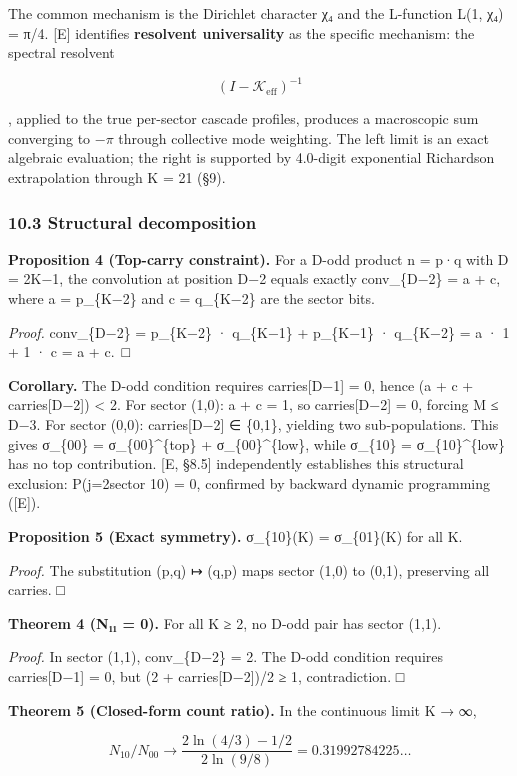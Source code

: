 \documentclass[
  11pt,
]{article}
\begin{document}
The common mechanism is the Dirichlet character χ₄ and the L-function L(1, χ₄) =
π/4. {[}E{]} identifies \textbf{resolvent universality} as the specific
mechanism: the spectral resolvent

\[(I - \mathcal{K}_{\mathrm{eff}})^{-1}\]

, applied to the true per-sector cascade profiles, produces a macroscopic sum
converging to \(-\pi\) through collective mode weighting. The left limit is an
exact algebraic evaluation; the right is supported by 4.0-digit exponential
Richardson extrapolation through K = 21 (§9).

\subsubsection{10.3 Structural decomposition}\label{structural-decomposition}

\textbf{Proposition 4 (Top-carry constraint).} For a D-odd product n = p·q with
D = 2K−1, the convolution at position D−2 equals exactly conv\_\{D−2\} = a + c,
where a = p\_\{K−2\} and c = q\_\{K−2\} are the sector bits.

\emph{Proof.} conv\_\{D−2\} = p\_\{K−2\} · q\_\{K−1\} + p\_\{K−1\} · q\_\{K−2\}
= a · 1 + 1 · c = a + c.~□

\textbf{Corollary.} The D-odd condition requires carries{[}D−1{]} = 0, hence (a
+ c + carries{[}D−2{]}) \textless{} 2. For sector (1,0): a + c = 1, so
carries{[}D−2{]} = 0, forcing M ≤ D−3. For sector (0,0): carries{[}D−2{]} ∈
\{0,1\}, yielding two sub-populations. This gives σ\_\{00\} =
σ\_\{00\}\^{}\{top\} + σ\_\{00\}\^{}\{low\}, while σ\_\{10\} =
σ\_\{10\}\^{}\{low\} has no top contribution. {[}E, §8.5{]} independently
establishes this structural exclusion: P(j=2\textbar sector 10) = 0, confirmed
by backward dynamic programming ({[}E{]}).

\textbf{Proposition 5 (Exact symmetry).} σ\_\{10\}(K) = σ\_\{01\}(K) for all K.

\emph{Proof.} The substitution (p,q) ↦ (q,p) maps sector (1,0) to (0,1),
preserving all carries. □

\textbf{Theorem 4 (N₁₁ = 0).} For all K ≥ 2, no D-odd pair has sector (1,1).

\emph{Proof.} In sector (1,1), conv\_\{D−2\} = 2. The D-odd condition requires
carries{[}D−1{]} = 0, but (2 + carries{[}D−2{]})/2 ≥ 1, contradiction. □

\textbf{Theorem 5 (Closed-form count ratio).} In the continuous limit K → ∞,

\[N_{10}/N_{00} \to \frac{2\ln(4/3) - 1/2}{2\ln(9/8)} = 0.31992784225\ldots\]
\end{document}
